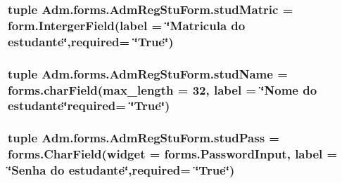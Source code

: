 \hypertarget{classAdm_1_1forms_1_1AdmRegStuForm_a3952916b9a15da1d6f5aef0fe70ca37a}{
\subsubsection[{stud\-Matric}]{\setlength{\rightskip}{0pt plus 5cm}tuple Adm.\-forms.\-Adm\-Reg\-Stu\-Form.\-stud\-Matric = form.\-Interger\-Field(label = \char`\"{}Matricula do estudante\char`\"{},required= \char`\"{}True\char`\"{})\hspace{0.3cm}{\ttfamily [static]}}}\label{classAdm_1_1forms_1_1AdmRegStuForm_a3952916b9a15da1d6f5aef0fe70ca37a}
\hypertarget{classAdm_1_1forms_1_1AdmRegStuForm_a148f5094b9746641dc5787e2d2f9b442}{
\subsubsection[{stud\-Name}]{\setlength{\rightskip}{0pt plus 5cm}tuple Adm.\-forms.\-Adm\-Reg\-Stu\-Form.\-stud\-Name = forms.\-char\-Field(max\-\_\-length = 32, label = \char`\"{}Nome do estudante\char`\"{}required= \char`\"{}True\char`\"{})\hspace{0.3cm}{\ttfamily [static]}}}\label{classAdm_1_1forms_1_1AdmRegStuForm_a148f5094b9746641dc5787e2d2f9b442}
\hypertarget{classAdm_1_1forms_1_1AdmRegStuForm_a64f5a91780fe16298e824629a7315327}{
\subsubsection[{stud\-Pass}]{\setlength{\rightskip}{0pt plus 5cm}tuple Adm.\-forms.\-Adm\-Reg\-Stu\-Form.\-stud\-Pass = forms.\-Char\-Field(widget = forms.\-Password\-Input, label = \char`\"{}Senha do estudante\char`\"{},required= \char`\"{}True\char`\"{})\hspace{0.3cm}{\ttfamily [static]}}}\label{classAdm_1_1forms_1_1AdmRegStuForm_a64f5a91780fe16298e824629a7315327}
